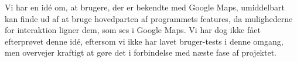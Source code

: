 Vi har en idé om, at brugere, der er bekendte med Google Maps, umiddelbart kan finde ud af at bruge hovedparten af programmets features, da mulighederne for interaktion ligner dem, som ses i Google Maps. Vi har dog ikke fået efterprøvet denne idé, eftersom vi ikke har lavet bruger-tests i denne omgang, men overvejer kraftigt at gøre det i forbindelse med næste fase af projektet.